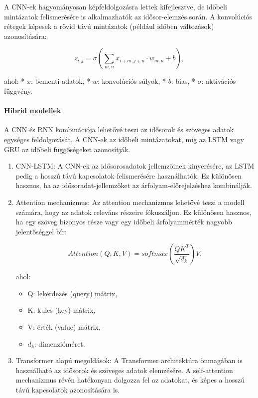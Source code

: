 \documentclass[11pt]{article}
\providecommand{\tightlist}{%
      \setlength{\itemsep}{0pt}\setlength{\parskip}{0pt}}
\begin{document}
A CNN-ek hagyományosan képfeldolgozásra lettek kifejlesztve, de időbeli
mintázatok felismerésére is alkalmazhatók az idősor-elemzés során. A
konvolúciós rétegek képesek a rövid távú mintázatok (például időben
változások) azonosítására:

\[z_{i,j} = \sigma\left(\sum_{m,n} x_{i+m,j+n} \cdot w_{m,n} + b\right),\]

ahol: * \(x\): bementi adatok, * \(w\): konvolúciós súlyok, * \(b\):
bias, * \(\sigma\): aktivációs függvény.

\paragraph{Hibrid modellek}\label{hibrid-modellek}

A CNN és RNN kombinációja lehetővé teszi az idősorok és szöveges adatok
egységes feldolgozását. A CNN-ek az időbeli mintázatokat, míg az LSTM
vagy GRU az időbeli függőségeket azonosítják.

\begin{enumerate}
\def\labelenumi{\arabic{enumi}.}
\item
  CNN-LSTM: A CNN-ek az idősorosadatok jellemzőinek kinyerésére, az LSTM
  pedig a hosszú távú kapcsolatok felismerésére használhatók. Ez
  különösen hasznos, ha az idősoradat-jellemzőket az
  árfolyam-előrejelzéshez kombinálják.
\item
  Attention mechanizmus: Az attention mechanizmus lehetővé teszi a
  modell számára, hogy az adatok releváns részeire fókuszáljon. Ez
  különösen hasznos, ha egy szöveg bizonyos része vagy egy időbeli
  árfolyammérték nagyobb jelentőséggel bír:

  \[Attention(Q,K,V) = softmax\left(\frac{QK^T}{\sqrt{d_k}}\right)V,\]

  ahol:

  \begin{itemize}
  \tightlist
  \item
    Q: lekérdezés (query) mátrix,
  \item
    K: kulcs (key) mátrix,
  \item
    V: érték (value) mátrix,
  \item
    \(d_k\): dimenzióméret.
  \end{itemize}
\item
  Transformer alapú megoldások: A Transformer architektúra önmagában is
  használható az idősorok és szöveges adatok elemzésére. A
  self-attention mechanizmus révén hatékonyan dolgozza fel az adatokat,
  és képes a hosszú távú kapcsolatok azonosítására is.
\end{enumerate}
\end{document}
